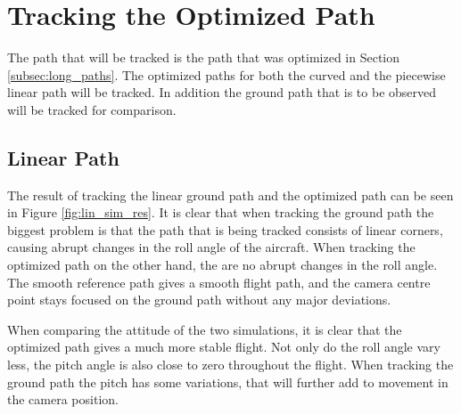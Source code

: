 \section{Tracking the Optimized Path}

The path that will be tracked is the path that was optimized in Section \ref{subsec:long_paths}. The optimized paths for both the curved and the piecewise linear path will be tracked. In addition the ground path that is to be observed will be tracked for comparison.


\subsection{Linear Path}

The result of tracking the linear ground path and the optimized path can be seen in Figure \ref{fig:lin_sim_res}. It is clear that when tracking the ground path the biggest problem is that the path that is being tracked consists of linear corners, causing abrupt changes in the roll angle of the aircraft. When tracking the optimized path on the other hand, the are no abrupt changes in the roll angle. The smooth reference path gives a smooth flight path, and the camera centre point stays focused on the ground path without any major deviations.

When comparing the attitude of the two simulations, it is clear that the optimized path gives a much more stable flight. Not only do the roll angle vary less, the pitch angle is also close to zero throughout the flight. When tracking the ground path the pitch has some variations, that will further add to movement in the camera position. 

